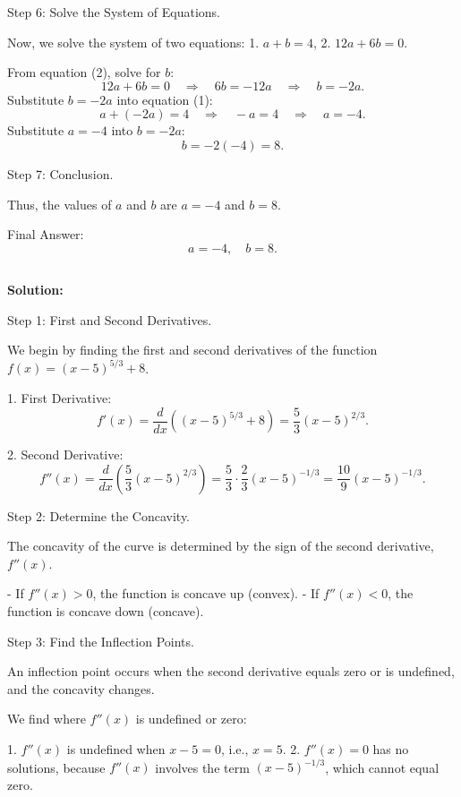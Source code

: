 \documentclass{article}
\begin{document}
Step 6: Solve the System of Equations.

Now, we solve the system of two equations:
1. \( a + b = 4 \),
2. \( 12a + 6b = 0 \).

From equation (2), solve for \( b \):
\[
12a + 6b = 0 \quad \Rightarrow \quad 6b = -12a \quad \Rightarrow \quad b = -2a.
\]
Substitute \( b = -2a \) into equation (1):
\[
a + (-2a) = 4 \quad \Rightarrow \quad -a = 4 \quad \Rightarrow \quad a = -4.
\]
Substitute \( a = -4 \) into \( b = -2a \):
\[
b = -2(-4) = 8.
\]

Step 7: Conclusion.

Thus, the values of \( a \) and \( b \) are \( a = -4 \) and \( b = 8 \).

Final Answer:
\[
a = -4, \quad b = 8.
\]

\subsection{}	

\textbf{Solution:}

Step 1: First and Second Derivatives.

We begin by finding the first and second derivatives of the function \( f(x) = (x - 5)^{5/3} + 8 \).

1. First Derivative:
\[
f'(x) = \frac{d}{dx} \left( (x - 5)^{5/3} + 8 \right) = \frac{5}{3}(x - 5)^{2/3}.
\]

2. Second Derivative:
\[
f''(x) = \frac{d}{dx} \left( \frac{5}{3}(x - 5)^{2/3} \right) = \frac{5}{3} \cdot \frac{2}{3} (x - 5)^{-1/3} = \frac{10}{9} (x - 5)^{-1/3}.
\]

Step 2: Determine the Concavity.

The concavity of the curve is determined by the sign of the second derivative, \( f''(x) \).

- If \( f''(x) > 0 \), the function is concave up (convex).
- If \( f''(x) < 0 \), the function is concave down (concave).

Step 3: Find the Inflection Points.

An inflection point occurs when the second derivative equals zero or is undefined, and the concavity changes.

We find where \( f''(x) \) is undefined or zero:

1. \( f''(x) \) is undefined when \( x - 5 = 0 \), i.e., \( x = 5 \).
2. \( f''(x) = 0 \) has no solutions, because \( f''(x) \) involves the term \( (x - 5)^{-1/3} \), which cannot equal zero.
\end{document}

